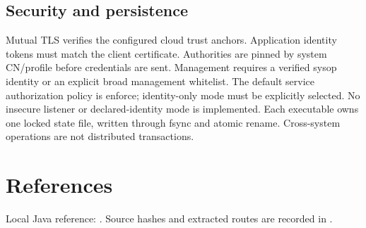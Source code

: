 \documentclass[a4paper]{arrowhead}
\begin{document}
\subsection{Security and persistence}
Mutual TLS verifies the configured cloud trust anchors. Application identity tokens must match the client certificate. Authorities are pinned by system CN/profile before credentials are sent. Management requires a verified sysop identity or an explicit broad management whitelist. The default service authorization policy is enforce; identity-only mode must be explicitly selected. No insecure listener or declared-identity mode is implemented. Each executable owns one locked state file, written through fsync and atomic rename. Cross-system operations are not distributed transactions.
\section{References}
Local Java reference: . Source hashes and extracted routes are recorded in .
\end{document}
